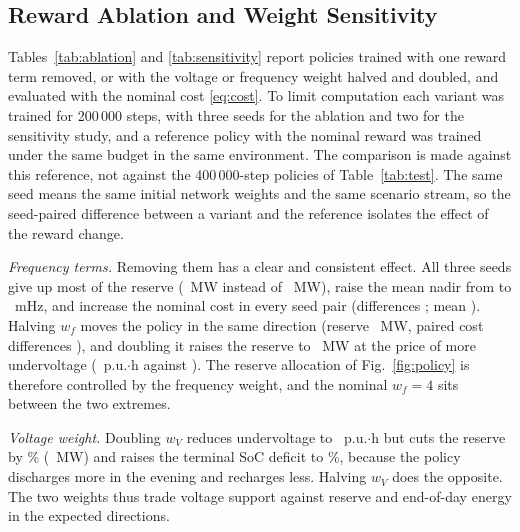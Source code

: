 

\subsection{Reward Ablation and Weight Sensitivity}
\label{sec:ablation}

Tables~\ref{tab:ablation} and \ref{tab:sensitivity} report policies
trained with one reward term removed, or with the voltage or frequency
weight halved and doubled, and evaluated with the nominal cost
\eqref{eq:cost}. To limit computation each variant was trained for
200\,000 steps, with three seeds for the ablation and two for the
sensitivity study, and a reference policy with the nominal reward was
trained under the same budget in the same environment.
The comparison is made against this reference, not against the
400\,000-step policies of Table~\ref{tab:test}. The same seed means
the same initial network weights and the same scenario stream, so the
seed-paired difference between a variant and the reference isolates the
effect of the reward change.

\emph{Frequency terms.} Removing them has a clear and consistent
effect. All three seeds give up most of the reserve
(\AblNoFReserveMeanMw~MW instead of \AblRefReserveMeanMw~MW), raise the
mean nadir from \AblRefNadirMeanHz{} to \AblNoFNadirMeanHz~mHz, and
increase the nominal cost in every seed pair (differences
\AblNoFPairDiffs; mean \AblNoFPairMean). Halving $w_f$ moves the policy
in the same direction (reserve \AblWfLowReserveMeanMw~MW, paired cost
differences \AblWfLowPairDiffs), and doubling it raises the reserve to
\AblWfHighReserveMeanMw~MW at the price of more undervoltage
(\AblWfHighUvPuH~p.u.$\cdot$h against \AblRefUvPuH). The reserve
allocation of Fig.~\ref{fig:policy} is therefore controlled by the
frequency weight, and the nominal $w_f=4$ sits between the two extremes.

\emph{Voltage weight.} Doubling $w_V$ reduces undervoltage to
\AblWvHighUvPuH~p.u.$\cdot$h but cuts the reserve by
\AblWvHighReserveRedPct\% (\AblWvHighReserveMeanMw~MW) and raises the terminal SoC deficit to
\AblWvHighSocDefPct\%, because the policy discharges more in the evening
and recharges less. Halving $w_V$ does the opposite. The two weights
thus trade voltage support against reserve and end-of-day energy in the
expected directions.

